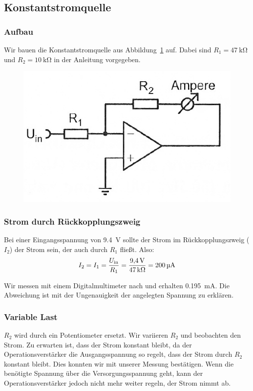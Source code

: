 \FloatBarrier
\subsection{Konstantstromquelle}

\subsubsection{Aufbau}

Wir bauen die Konstantstromquelle aus Abbildung~\ref{fig:5-1} auf. Dabei sind
$R_1 = \SI{47}{\kilo\ohm}$ und $R_2 = \SI{10}{\kilo\ohm}$ in der Anleitung
vorgegeben.

\begin{figure}[htbp]
	\centering
	\includegraphics[width=.5\linewidth]{Anleitung/5-1.png}
	\caption{%
		\cite[Abbildung~5.1]{physik313-Anleitung}
	}
	\label{fig:5-1}
\end{figure}

\subsubsection{Strom durch Rückkopplungszweig}

Bei einer Eingangsspannung von \SI{9.4}{\volt} sollte der Strom im
Rückkopplungszweig ($I_2$) der Strom sein, der auch durch $R_1$ fließt. Also:
\[
	I_2
	= I_1
	= \frac{U_\text{in}}{R_1}
	= \frac{\SI{9.4}\volt}{\SI{47}{\kilo\ohm}}
	= \SI{200}{\micro\ampere}
\]

Wir messen mit einem Digitalmultimeter nach und erhalten
\SI{.195}{\milli\ampere}. Die Abweichung ist mit der Ungenauigkeit der
angelegten Spannung zu erklären.

\subsubsection{Variable Last}

$R_2$ wird durch ein Potentiometer ersetzt. Wir variieren $R_2$ und beobachten
den Strom. Zu erwarten ist, dass der Strom konstant bleibt, da der
Operationsverstärker die Ausgangsspannung so regelt, dass der Strom durch $R_2$
konstant bleibt. Dies konnten wir mit unserer Messung bestätigen. Wenn die
benötigte Spannung über die Versorgungsspannung geht,
kann der Operationsverstärker jedoch nicht mehr weiter regeln, der Strom nimmt
ab.

